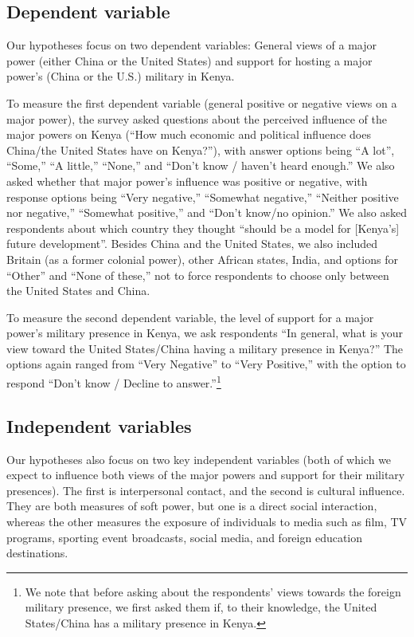 \subsection*{Dependent variable} 

Our hypotheses focus on two dependent variables: General views of a major power (either China or the United States) and support for hosting a major power's (China or the U.S.) military in Kenya. 

To measure the first dependent variable (general positive or negative views on a major power), the survey asked questions about the perceived influence of the major powers on Kenya (``How much economic and political influence does China/the United States have on Kenya?''), with answer options being ``A lot'', ``Some,'' ``A little,'' ``None,'' and ``Don’t know / haven’t heard enough.'' We also asked whether that major power's influence was positive or negative, with response options being ``Very negative,'' ``Somewhat negative,'' ``Neither positive nor negative,'' ``Somewhat positive,'' and ``Don't know/no opinion.'' We also asked respondents about which country they thought ``should be a model for [Kenya's] future development''. Besides China and the United States, we also 
included Britain (as a former colonial power), other African states, India, and options for ``Other'' and ``None of these,'' not to force respondents to choose only between the United States and China.

To measure the second dependent variable, the level of support for a major power's military presence in Kenya, we ask respondents ``In general, what is your view toward the United States/China having a military presence in Kenya?'' The options again ranged from ``Very Negative'' to ``Very Positive,'' with the option to respond ``Don't know / Decline to answer.''\footnote{We note that before asking about the respondents' views towards the foreign military presence, we first asked them if, to their knowledge, the United States/China has a military presence in Kenya.}  

\subsection*{Independent variables} 

Our hypotheses also focus on two key independent variables (both of which we expect to influence both views of the major powers and support for their military presences). The first is interpersonal contact, and the second is cultural influence. They are both measures of soft power, but one is a direct social interaction, whereas the other measures the exposure of individuals to media such as film, TV programs, sporting event broadcasts, social media, and foreign education destinations. 


